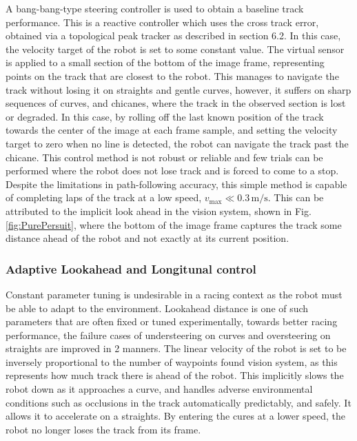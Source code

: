             A bang-bang-type steering controller is used to obtain a baseline track performance. 
            This is a reactive controller which uses the cross track error, obtained via a topological peak tracker as described in section 6.2.
            In this case, the velocity target of the robot is set to some constant value. 
            The virtual sensor is applied to a small section of the bottom of the image frame, representing points on the track that are closest to the robot. 
            This manages to navigate the track without losing it on straights and gentle curves, however, it suffers on
            sharp sequences of curves, and chicanes, where the track in the observed section is lost or degraded. In this case, by rolling off the last known position 
            of the track towards the center of the image at each frame sample, and setting the velocity target to zero when no line is detected,
            the robot can navigate the track past the chicane. This control method is not robust or reliable and few trials can be performed where 
            the robot does not lose track and is forced to come to a stop.
            Despite the limitations in path-following accuracy, this simple method is capable of completing laps of the track at a
            low speed, \( v_{\text{max}} \ll 0.3 \, \text{m/s} \).
            This can be attributed to the implicit look ahead in the vision system, shown in Fig.\ref{fig:PurePersuit}, where the bottom of the image frame 
            captures the track some distance ahead of the robot and not exactly at its current position.
            
            
            \subsubsection{Adaptive Lookahead and Longitunal control}
            Constant parameter tuning is undesirable in a racing context as the robot must be able to adapt to the environment.
            Lookahead distance is one of such parameters that are often fixed or tuned experimentally,
            towards better racing performance, the failure cases of understeering on curves and oversteering on straights 
            are improved in 2 manners. The linear velocity of the robot is set to be inversely proportional to the number of waypoints found vision system,
            as this represents how much track there is ahead of the robot. This implicitly slows the robot down as it approaches a curve, 
            and handles adverse environmental conditions such as occlusions in the track automatically predictably, and safely. 
            It allows it to accelerate on a straights. By entering the cures at a lower speed, the robot no longer loses the track from its frame. 

